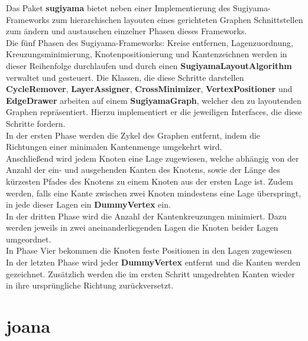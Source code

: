 Das Paket \textbf{sugiyama} bietet neben einer Implementierung des Sugiyama-Frameworks zum hierarchischen layouten eines gerichteten Graphen Schnittstellen zum ändern und austauschen einzelner Phasen dieses Frameworks.\\
Die fünf Phasen des Sugiyama-Frameworks: Kreise entfernen, Lagenzuordnung, Kreuzungsminimierung, Knotenpositionierung und Kantenzeichnen werden in dieser Reihenfolge durchlaufen und durch einen \textbf{SugiyamaLayoutAlgorithm} verwaltet und gesteuert. Die Klassen, die diese Schritte darstellen \textbf{CycleRemover}, \textbf{LayerAssigner}, \textbf{CrossMinimizer}, \textbf{VertexPositioner} und \textbf{EdgeDrawer} arbeiten auf einem \textbf{SugiyamaGraph}, welcher den zu layoutenden Graphen repräsentiert. Hierzu implementiert er die jeweiligen Interfaces, die diese Schritte fordern.\\
In der ersten Phase werden die Zykel des Graphen entfernt, indem die Richtungen einer minimalen Kantenmenge umgekehrt wird.\\
Anschließend wird jedem Knoten eine Lage zugewiesen, welche abhängig von der Anzahl der ein- und ausgehenden Kanten des Knotens, sowie der Länge des kürzesten Pfades des Knotens zu einem Knoten aus der ersten Lage ist. Zudem werden, falls eine Kante zwischen zwei Knoten mindestens eine Lage überspringt, in jede dieser Lagen ein \textbf{DummyVertex} ein.\\
In der dritten Phase wird die Anzahl der Kantenkreuzungen minimiert. Dazu werden jeweils in zwei aneinanderliegenden Lagen die Knoten beider Lagen umgeordnet.\\
In Phase Vier bekommen die Knoten feste Positionen in den Lagen zugewiesen\\
In der letzten Phase wird jeder \textbf{DummyVertex} entfernt und die Kanten werden gezeichnet. Zusätzlich werden die im ersten Schritt umgedrehten Kanten wieder in ihre ursprüngliche Richtung zurückversetzt.

\newpage

\section{joana}

